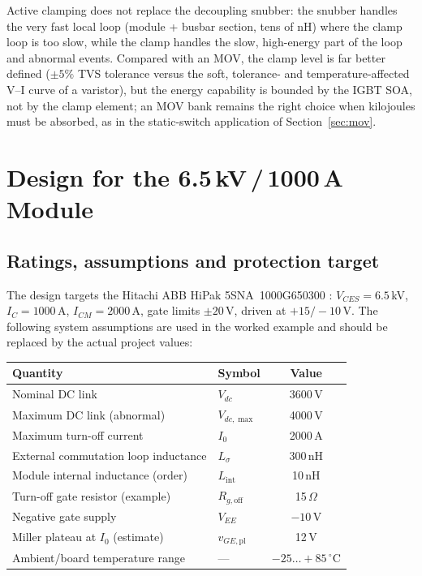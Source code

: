 \documentclass[11pt,a4paper]{article}
\begin{document}
Active clamping does not replace the decoupling snubber: the snubber
handles the very fast local loop (module + busbar section, tens of nH)
where the clamp loop is too slow, while the clamp handles the slow,
high-energy part of the loop and abnormal events. Compared with an MOV,
the clamp level is far better defined ($\pm 5\%$ TVS tolerance versus
the soft, tolerance- and temperature-affected V--I curve of a
varistor), but the energy capability is bounded by the IGBT SOA, not by
the clamp element; an MOV bank remains the right choice when kilojoules
must be absorbed, as in the static-switch application of
Section~\ref{sec:mov}.

\section{Design for the 6.5\,kV\,/\,1000\,A Module}
\label{sec:design}

\subsection{Ratings, assumptions and protection target}

The design targets the Hitachi ABB HiPak 5SNA~1000G650300
\cite{ds5sna}: $V_{CES}=6.5$\,kV, $I_C=1000$\,A, $I_{CM}=2000$\,A, gate
limits $\pm 20$\,V, driven at $+15/-10$\,V. The following system
assumptions are used in the worked example and should be replaced by
the actual project values:

\begin{center}
\begin{tabular}{llc}
\toprule
Quantity & Symbol & Value \\
\midrule
Nominal DC link & $V_{dc}$ & 3600\,V \\
Maximum DC link (abnormal) & $V_{dc,\max}$ & 4000\,V \\
Maximum turn-off current & $I_0$ & 2000\,A \\
External commutation loop inductance & $L_\sigma$ & 300\,nH \\
Module internal inductance (order) & $L_{\mathrm{int}}$ & 10\,nH \\
Turn-off gate resistor (example) & $R_{g,\mathrm{off}}$ & 15\,$\Omega$ \\
Negative gate supply & $V_{EE}$ & $-10$\,V \\
Miller plateau at $I_0$ (estimate) & $v_{GE,\mathrm{pl}}$ & 12\,V \\
Ambient/board temperature range & --- & $-25\ldots+85\,^\circ$C \\
\bottomrule
\end{tabular}
\end{center}
\end{document}
